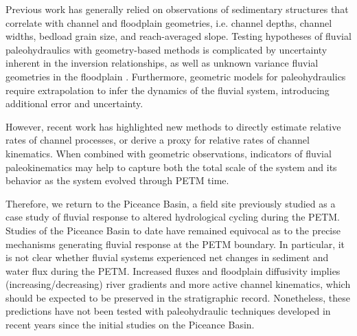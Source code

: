 \documentclass[draft]{compact_proposal}
\begin{document}
Previous work has generally relied on observations of sedimentary structures that correlate with channel and floodplain geometries, i.e. channel depths, channel widths, bedload grain size, and reach-averaged slope.
Testing hypotheses of fluvial paleohydraulics with geometry-based methods is complicated by uncertainty inherent in the inversion relationships, as well as unknown variance fluvial geometries in the floodplain .
Furthermore, geometric models for paleohydraulics require extrapolation to infer the dynamics of the fluvial system, introducing additional error and uncertainty.

However, recent work has highlighted new methods to directly estimate relative rates of channel processes, or derive a proxy for relative rates of channel kinematics.
When combined with geometric observations, indicators of fluvial paleokinematics may help to capture both the total scale of the system and its behavior as the system evolved through PETM time.



Therefore, we return to the Piceance Basin, a field site previously studied as a case study of fluvial response to altered hydrological cycling during the PETM.
Studies of the Piceance Basin to date  have remained equivocal as to the precise mechanisms generating fluvial response at the PETM boundary.
In particular, it is not clear whether fluvial systems experienced net changes in sediment and water flux during the PETM.
Increased fluxes and floodplain diffusivity implies (increasing/decreasing) river gradients and more active channel kinematics, which should be expected to be preserved in the stratigraphic record.
Nonetheless, these predictions have not been tested with paleohydraulic techniques developed in recent years since the initial studies on the Piceance Basin.
\end{document}
